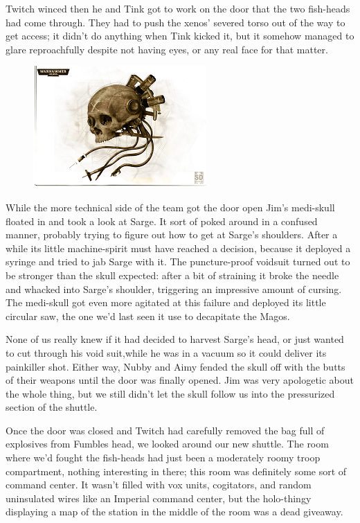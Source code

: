 Twitch winced then he and Tink got to work on the door that the two fish-heads had come through. 
They had to push the xenos' severed torso out of the way to get access; 
it didn't do anything when Tink kicked it, but it somehow managed to glare reproachfully despite not having eyes, or any real face for that matter.

\begin{figure}
	\begin{center}
		\includegraphics[width=\figwidth]{pics/11/55.png}
	\end{center}
\end{figure}
While the more technical side of the team got the door open Jim's medi-skull floated in and took a look at Sarge. 
It sort of poked around in a confused manner, probably trying to figure out how to get at Sarge's shoulders. 
After a while its little machine-spirit must have reached a decision, because it deployed a syringe and tried to jab Sarge with it. 
The puncture-proof voidsuit turned out to be stronger than the skull expected: 
after a bit of straining it broke the needle and whacked into Sarge's shoulder, triggering an impressive amount of cursing. 
The medi-skull got even more agitated at this failure and deployed its little circular saw, the one we'd last seen it use to decapitate the Magos.

None of us really knew if it had decided to harvest Sarge's head, or just wanted to cut through his void suit,while he was in a vacuum so it could deliver its painkiller shot. 
Either way, Nubby and Aimy fended the skull off with the butts of their weapons until the door was finally opened. 
Jim was very apologetic about the whole thing, but we still didn't let the skull follow us into the pressurized section of the shuttle.

Once the door was closed and Twitch had carefully removed the bag full of explosives from Fumbles head, we looked around our new shuttle. 
The room where we'd fought the fish-heads had just been a moderately roomy troop compartment, nothing interesting in there; 
this room was definitely some sort of command center. 
It wasn't filled with vox units, cogitators, and random uninsulated wires like an Imperial command center, but the holo-thingy displaying a map of the station in the middle of the room was a dead giveaway.

